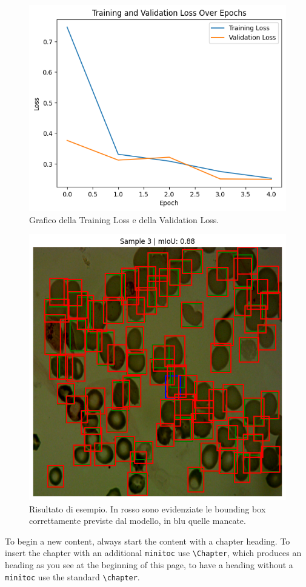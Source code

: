 \documentclass[minted, draw]{../tex/hebdomon}
\begin{document}
\begin{figure}[H]
  \centering
  \includegraphics[width=.6\linewidth]{figures/loss.png}
  \caption{Grafico della Training Loss e della Validation Loss.}
  \label{fig:loss}
\end{figure}
%
\begin{figure}[H]
  \centering
  \includegraphics[width=.6\linewidth]{figures/ex_result.png}
  \caption{Risultato di esempio. In rosso sono evidenziate le bounding box correttamente previste dal modello, in blu quelle mancate.}
  \label{fig:loss}
\end{figure}
%





To begin a new content, always start the content with a chapter heading. To
insert the chapter with an additional \lstinline[columns=fixed]{minitoc}
use \lstinline[columns=fixed]{\Chapter}, which produces an heading as
you see at the beginning of this page, to have a heading without
a \lstinline[columns=fixed]{minitoc} use the standard
\lstinline[columns=fixed]{\chapter}.
\end{document}
